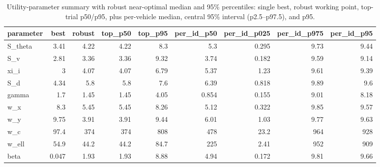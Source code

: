 \begin{table}[t]
\centering
\caption{Utility-parameter summary with robust near-optimal median and 95\% percentiles: single best, robust working point, top-trial p50/p95, plus per-vehicle median, central 95\% interval (p2.5--p97.5), and p95.}
\label{tab:utility_parameter_95pct}
\begin{tabular}{lrrrrrrrr}
\toprule
parameter & best & robust & top\_p50 & top\_p95 & per\_id\_p50 & per\_id\_p025 & per\_id\_p975 & per\_id\_p95 \\
\midrule
S\_theta & 3.41 & 4.22 & 4.22 & 8.3 & 5.3 & 0.295 & 9.73 & 9.44 \\
S\_v & 2.81 & 3.36 & 3.36 & 9.32 & 3.74 & 0.182 & 9.59 & 9.14 \\
xi\_i & 3 & 4.07 & 4.07 & 6.79 & 5.37 & 1.23 & 9.61 & 9.39 \\
S\_d & 4.34 & 5.8 & 5.8 & 7.6 & 6.39 & 0.818 & 9.89 & 9.6 \\
gamma & 1.7 & 1.45 & 1.45 & 4.05 & 0.854 & 0.155 & 9.01 & 8.18 \\
w\_x & 8.3 & 5.45 & 5.45 & 8.26 & 5.12 & 0.322 & 9.85 & 9.57 \\
w\_y & 9.75 & 3.91 & 3.91 & 9.44 & 6.01 & 1.03 & 9.77 & 9.63 \\
w\_c & 97.4 & 374 & 374 & 808 & 478 & 23.2 & 964 & 928 \\
w\_ell & 54.9 & 44.2 & 44.2 & 84.7 & 225 & 2.41 & 952 & 909 \\
beta & 0.047 & 1.93 & 1.93 & 8.88 & 4.94 & 0.172 & 9.81 & 9.66 \\
\bottomrule
\end{tabular}
\end{table}
